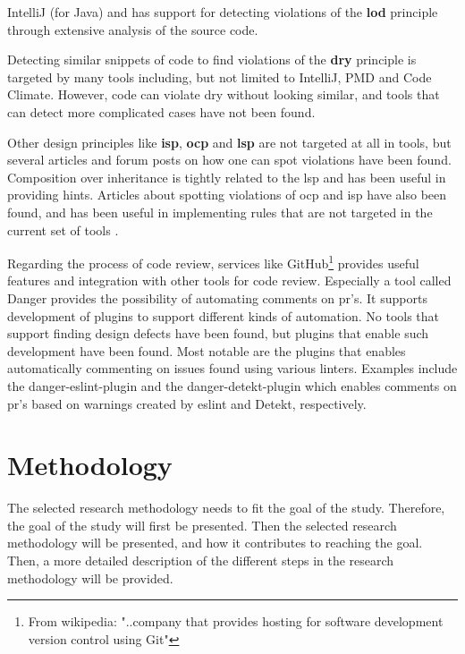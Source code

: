 \documentclass{report}
\begin{document}
IntelliJ \cite{IntelliJ} (for Java) and \cite{pmd} has support for detecting violations of the \textbf{\gls{lod}} principle through extensive analysis of the source code.

Detecting similar snippets of code to find violations of the \textbf{\gls{dry}} principle is targeted by many tools including, but not limited to IntelliJ\cite{IntelliJ}, PMD\cite{pmd} and Code Climate\cite{codeclimate}. However, code can violate \gls{dry} without looking similar, and tools that can detect more complicated cases have not been found.  

Other design principles like \textbf{\gls{isp}}, \textbf{\gls{ocp}} and \textbf{\gls{lsp}} are not targeted at all in tools, but several articles and forum posts on how one can spot violations have been found. Composition over inheritance is tightly related to the \gls{lsp} and \cite{composition-over-inheritance-stackoverflow} has been useful in providing hints. Articles about spotting violations of \gls{ocp} and \gls{isp} have also been found, and has been useful in implementing rules that are not targeted in the current set of tools \cite{ocp-violations} \cite{ocp2} \cite{isp-violation}.

Regarding the process of code review, services like GitHub\cite{github}\footnote{From wikipedia: "..company that provides hosting for software development version control using Git"\cite{github-wiki}} provides useful features and integration with other tools for code review. Especially a tool called Danger\cite{danger} provides the possibility of automating comments on \gls{pr}'s. It supports development of plugins to support different kinds of automation. No tools that support finding design defects have been found, but plugins that enable such development have been found. Most notable are the plugins that enables automatically commenting on issues found using various linters. Examples include the danger-eslint-plugin\cite{danger-eslint-plugin} and the danger-detekt-plugin\cite{danger-detekt-plugin} which enables comments on \gls{pr}'s based on warnings created by eslint\cite{eslint} and Detekt\cite{detekt}, respectively. 

\chapter{Methodology}
\label{methodology}
The selected research methodology needs to fit the goal of the study. Therefore, the goal of the study will first be presented. Then the selected research methodology will be presented, and how it contributes to reaching the goal. Then, a more detailed description of the different steps in the research methodology will be provided. 
\end{document}

